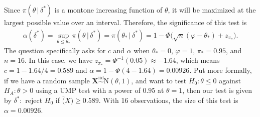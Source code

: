 \documentclass[10pt]{article}
\begin{document}
Since \(\pi( \theta\,|\, \delta^*)\) is a montone increasing function of \(\theta\),
it will be maximized at the largest possible value over an interval. 
Therefore, the significance of this test is 
\begin{align*}
    \alpha(\delta^*)
    = \sup_{\theta \le \theta_*} \pi(\theta \,|\, \delta^*)
    = \pi(\theta_* \,|\, \delta^*)
    = 1 - \Phi \big(  \sqrt{n}(\varphi - \theta_*) + z_{\pi_*} \big).
\end{align*}
The question specifically asks for \(c\) and \(\alpha\) when \(\theta_* = 0\), \(\varphi = 1\), \(\pi_* = 0.95\), and \(n = 16\). In this case, we have 
\(z_{\pi_*} = \Phi^{-1}(0.05) \approx -1.64\), which means \(c = 1 - 1.64 / 4 = 0.589\) and \(\alpha = 1 - \Phi(4 - 1.64) = 0.00926\). Put more formally,
if we have a random sample \(\bm{X} \overset{\mathrm{iid}}{\sim} \mathrm{N}(\theta,1)\), and want to test \(H_0 : \theta \le 0\) against \(H_A : \theta > 0\)
using a UMP test with a power of \(0.95\) at \(\theta = 1\), then our test is given by \(\delta^* :\) reject \(H_0\) if \(\bar(X) \ge 0.589\). 
With 16 observations, the size of this test is \(\alpha = 0.00926\). 

\end{document}
